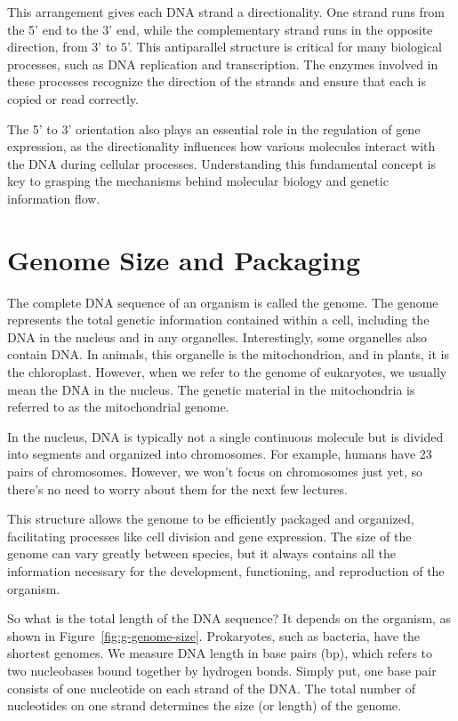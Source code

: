 This arrangement gives each DNA strand a directionality. One strand runs from the 5' end to the 3' end, while the complementary strand runs in the opposite direction, from 3' to 5'. This antiparallel structure is critical for many biological processes, such as DNA replication and transcription. The enzymes involved in these processes recognize the direction of the strands and ensure that each is copied or read correctly.

The 5' to 3' orientation also plays an essential role in the regulation of gene expression, as the directionality influences how various molecules interact with the DNA during cellular processes. Understanding this fundamental concept is key to grasping the mechanisms behind molecular biology and genetic information flow.

\section{Genome Size and Packaging}

The complete DNA sequence of an organism is called the genome. The genome represents the total genetic information contained within a cell, including the DNA in the nucleus and in any organelles. Interestingly, some organelles also contain DNA. In animals, this organelle is the mitochondrion, and in plants, it is the chloroplast. However, when we refer to the genome of eukaryotes, we usually mean the DNA in the nucleus. The genetic material in the mitochondria is referred to as the mitochondrial genome.

In the nucleus, DNA is typically not a single continuous molecule but is divided into segments and organized into chromosomes. For example, humans have 23 pairs of chromosomes. However, we won’t focus on chromosomes just yet, so there’s no need to worry about them for the next few lectures.

This structure allows the genome to be efficiently packaged and organized, facilitating processes like cell division and gene expression. The size of the genome can vary greatly between species, but it always contains all the information necessary for the development, functioning, and reproduction of the organism.


So what is the total length of the DNA sequence? It depends on the organism, as shown in Figure~\ref{fig:g-genome-size}. Prokaryotes, such as bacteria, have the shortest genomes. We measure DNA length in base pairs (bp), which refers to two nucleobases bound together by hydrogen bonds. Simply put, one base pair consists of one nucleotide on each strand of the DNA. The total number of nucleotides on one strand determines the size (or length) of the genome.

